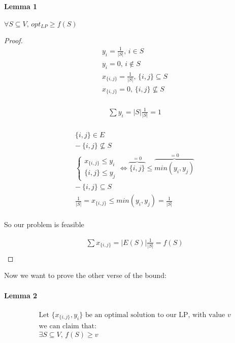 \documentclass[]{article}
\begin{document}
\paragraph{Lemma 1} $\forall S\subseteq V,\, opt_{LP} \geq f(S)$
\begin{proof}
	\begin{align*}
		&y_i = \frac{1}{|S|},\, i \in S\\
		&y_i = 0,\, i \notin S\\
		&x_{\{i, j\}} = \frac{1}{|S|},\, \{i, j\} \subseteq S\\
		&x_{\{i, j\}} = 0,\, \{i, j\} \nsubseteq S\\
	\end{align*}
	
	\begin{align*}
		&\sum y_i = |S|\frac{1}{|S|} = 1\\
	\end{align*}
	
	\begin{align*}
		&\{i, j\} \in E\\
		&-\ \{i, j\} \nsubseteq S\\
		&\begin{cases}
		x_{\{i, j\}} \leq y_i\\
		\{i, j\} \leq y_j
		\end{cases} \iff \overbrace{{\{i, j\}}}^{=0} \leq \overbrace{min(y_i, y_j)}^{=0}\\
	&-\ \{i, j\} \subseteq S\\
	&\frac{1}{|S|} = x_{\{i, j\}} \leq min(y_i, y_j) = \frac{1}{|S|}\\
	\end{align*}
	
	So our problem is feasible
	
	\begin{align*}
	&\sum x_{\{i, j\}} = |E(S)| \frac{1}{|S|} = f(S)\\
	\end{align*}
\end{proof}

	Now we want to prove the other verse of the bound:
	
	\paragraph{Lemma 2}
	\begin{align*}
	&\text{Let } \{x_{\{i, j\}}, y_i\}\text{ be an optimal solution to our LP, with value } v\\
	&\text{we can claim that:}\\ 
	& \exists S \subseteq V,\, f(S) \geq v\\
	\end{align*}
	
\end{document}
